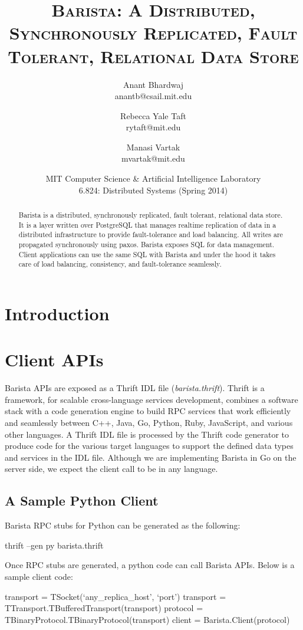 \documentclass[a4paper]{article}
\title{\textsc{Barista: A Distributed, Synchronously Replicated, Fault Tolerant, Relational Data Store}}
\author{Anant Bhardwaj \\ anantb@csail.mit.edu \and Rebecca Yale Taft \\ rytaft@mit.edu \and Manasi Vartak \\ mvartak@mit.edu}
\date{MIT Computer Science \& Artificial Intelligence Laboratory \\ 6.824: Distributed Systems (Spring 2014)}
\begin{document}
\maketitle
\begin{multicols}{2}
\begin{abstract}
\noindent
Barista is a distributed, synchronously replicated, fault tolerant, relational data store. It is a layer written over PostgreSQL that manages realtime replication of data in a distributed infrastructure to provide fault-tolerance and load balancing. All writes are propagated synchronously using paxos. Barista exposes SQL for data management. Client applications can use the same SQL with Barista and under the hood it takes care of load balancing, consistency, and fault-tolerance seamlessly.
\end{abstract}
\section{Introduction}

\section{Client APIs}
\par{
Barista APIs are exposed as a Thrift IDL file (\emph{barista.thrift}). Thrift is a framework, for scalable cross-language services development, combines a software stack with a code generation engine to build RPC services that work efficiently and seamlessly between C++, Java, Go, Python, Ruby, JavaScript, and various other languages. A Thrift IDL file is processed by the Thrift code generator to produce code for the various target languages to support the defined data types and services in the IDL file. Although we are implementing Barista in Go on the server side, we expect the client call to be in any language.
}
\subsection{A Sample Python Client}
\par{
Barista RPC stubs for Python can be generated as the following:
\begin{spverbatim}
thrift --gen py barista.thrift

\end{spverbatim}
}
\par{
Once RPC stubs are generated, a python code can call Barista APIs. Below is a sample client code:
}
\par{
\tiny {
\begin{spverbatim}
transport = TSocket(`any_replica_host', `port')
transport = TTransport.TBufferedTransport(transport)
protocol = TBinaryProtocol.TBinaryProtocol(transport)
client = Barista.Client(protocol)


\end{spverbatim}}}
\end{multicols}
\end{document}
